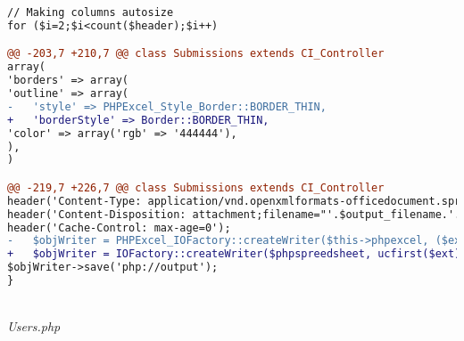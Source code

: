 \begin{lstlisting}[language=diff, basicstyle=\ttfamily, frame=single,
columns=fullflexible, keepspaces=true, breaklines=true]
// Making columns autosize
for ($i=2;$i<count($header);$i++)

@@ -203,7 +210,7 @@ class Submissions extends CI_Controller
array(
'borders' => array(
'outline' => array(
-   'style' => PHPExcel_Style_Border::BORDER_THIN,
+   'borderStyle' => Border::BORDER_THIN,
'color' => array('rgb' => '444444'),
),
)

@@ -219,7 +226,7 @@ class Submissions extends CI_Controller
header('Content-Type: application/vnd.openxmlformats-officedocument.spreadsheetml.sheet');
header('Content-Disposition: attachment;filename="'.$output_filename.'.'.$ext.'"');
header('Cache-Control: max-age=0');
-   $objWriter = PHPExcel_IOFactory::createWriter($this->phpexcel, ($ext==='xlsx'?'Excel2007':'Excel5'));
+   $objWriter = IOFactory::createWriter($phpspreedsheet, ucfirst($ext));
$objWriter->save('php://output');
}
\end{lstlisting}
~\\	
	\textit{Users.php}
